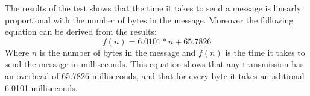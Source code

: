 The results of the test shows that the time it takes to send a message is linearly proportional with the number of bytes in the message.
Moreover the following equation can be derived from the results:
\begin{equation}
f(n)=6.0101 * n + 65.7826
\end{equation}
Where $n$ is the number of bytes in the message and $f(n)$ is the time it takes to send the message in milliseconds.
This equation shows that any transmission has an overhead of 65.7826 milliseconds, and that for every byte it takes an aditional 6.0101 milliseconds.    

